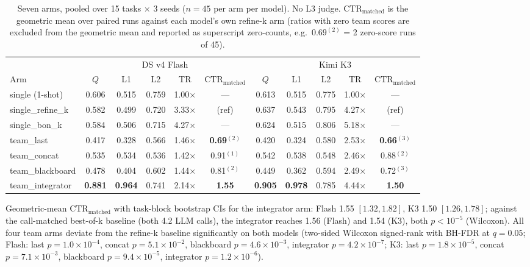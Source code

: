 \documentclass[sigconf,anonymous]{aamas}
\newcommand{\ctrm}{\mathrm{CTR}_{\text{matched}}}
\begin{document}
\begin{table}[t]
\centering
\caption{Seven arms, pooled over 15 tasks $\times$ 3 seeds ($n{=}45$ per arm per model). No L3 judge. $\ctrm$ is the geometric mean over paired runs against each model's own refine-k arm (ratios with zero team scores are excluded from the geometric mean and reported as superscript zero-counts, e.g.\ $0.69^{(2)}$ = 2 zero-score runs of 45).}
\label{tab:main}
\small
\setlength{\tabcolsep}{4pt}
\begin{tabular}{lccccc|ccccc}
\toprule
& \multicolumn{5}{c|}{DS v4 Flash} & \multicolumn{5}{c}{Kimi K3} \\
Arm & $Q$ & L1 & L2 & TR & $\ctrm$ & $Q$ & L1 & L2 & TR & $\ctrm$ \\
\midrule
single (1-shot) & 0.606 & 0.515 & 0.759 & 1.00$\times$ & --- & 0.613 & 0.515 & 0.775 & 1.00$\times$ & --- \\
single\_refine\_k & 0.582 & 0.499 & 0.720 & 3.33$\times$ & (ref) & 0.637 & 0.543 & 0.795 & 4.27$\times$ & (ref) \\
single\_bon\_k & 0.584 & 0.506 & 0.715 & 4.27$\times$ & --- & 0.624 & 0.515 & 0.806 & 5.18$\times$ & --- \\
team\_last & 0.417 & 0.328 & 0.566 & 1.46$\times$ & \textbf{0.69}$^{(2)}$ & 0.420 & 0.324 & 0.580 & 2.53$\times$ & \textbf{0.66}$^{(3)}$ \\
team\_concat & 0.535 & 0.534 & 0.536 & 1.42$\times$ & 0.91$^{(1)}$ & 0.542 & 0.538 & 0.548 & 2.46$\times$ & 0.88$^{(2)}$ \\
team\_blackboard & 0.478 & 0.404 & 0.602 & 1.44$\times$ & 0.81$^{(2)}$ & 0.449 & 0.362 & 0.594 & 2.49$\times$ & 0.72$^{(3)}$ \\
team\_integrator & \textbf{0.881} & \textbf{0.964} & 0.741 & 2.14$\times$ & \textbf{1.55} & \textbf{0.905} & \textbf{0.978} & 0.785 & 4.44$\times$ & \textbf{1.50} \\
\bottomrule
\end{tabular}
\end{table}

Geometric-mean $\ctrm$ with task-block bootstrap CIs for the integrator arm: Flash 1.55 $[1.32, 1.82]$, K3 1.50 $[1.26, 1.78]$; against the call-matched best-of-k baseline (both 4.2 LLM calls), the integrator reaches 1.56 (Flash) and 1.54 (K3), both $p<10^{-5}$ (Wilcoxon). All four team arms deviate from the refine-k baseline significantly on both models (two-sided Wilcoxon signed-rank with BH-FDR at $q=0.05$; Flash: last $p=1.0\times10^{-4}$, concat $p=5.1\times10^{-2}$, blackboard $p=4.6\times10^{-3}$, integrator $p=4.2\times10^{-7}$; K3: last $p=1.8\times10^{-5}$, concat $p=7.1\times10^{-3}$, blackboard $p=9.4\times10^{-5}$, integrator $p=1.2\times10^{-6}$).
\end{document}
